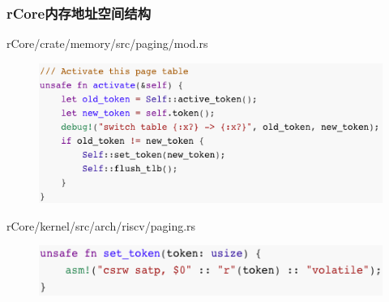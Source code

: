 \begin{frame}[fragile]
    \frametitle{rCore内存地址空间结构}

 	\begin{block}{rCore/crate/memory/src/paging/mod.rs}
    \begin{figure}
    \includegraphics[width=0.7\linewidth]{figs/fn-activate.png}
    \end{figure}
 	\end{block}

% 
 	\begin{block}{rCore/kernel/src/arch/riscv/paging.rs}
    \begin{figure}
    \includegraphics[width=0.6\linewidth]{figs/fn-set_token.png}
    \end{figure}
 	\end{block}

% 
\end{frame}
